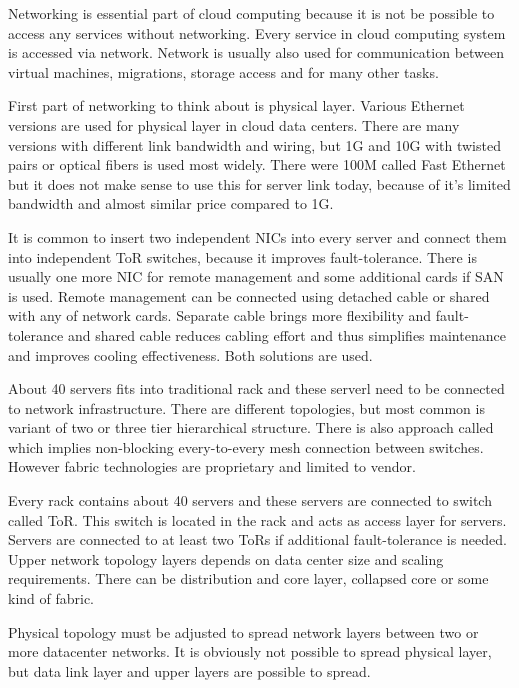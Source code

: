 

Networking is essential part of cloud computing because it is not be possible to access any services without networking. Every service in cloud computing system is accessed via network. Network is usually also used for communication between virtual machines, migrations, storage access and for many other tasks.


First part of networking to think about is physical layer. Various Ethernet versions are used for physical layer in cloud data centers. There are many versions with different link bandwidth and wiring, but 1G and 10G with twisted pairs or optical fibers is used most widely. There were 100M called Fast Ethernet but it does not make sense to use this for server link today, because of it's limited bandwidth and almost similar price compared to 1G.

It is common to insert two independent \Ac{NIC}s into every server and connect them into independent \Ac{ToR} switches, because it improves fault-tolerance. There is usually one more \Ac{NIC} for remote management and some additional cards if \Ac{SAN} is used. Remote management can be connected using detached cable or shared with any of network cards. Separate cable brings more flexibility and fault-tolerance and shared cable reduces cabling effort and thus simplifies maintenance and improves cooling effectiveness. Both solutions are used. 

About 40 servers fits into traditional rack and these serverl need to be connected to network infrastructure. There are different topologies, but most common is variant of two or three tier hierarchical structure. \cite{survey-architectures} There is also approach called  which implies non-blocking every-to-every mesh connection between switches. However fabric technologies are proprietary and limited to vendor. 

Every rack contains about 40 servers and these servers are connected to switch called \Ac{ToR}. This switch is located in the rack and acts as access layer for servers. Servers are connected to at least two \Ac{ToR}s if additional fault-tolerance is needed. Upper network topology layers depends on data center size and scaling requirements. There can be distribution and core layer, collapsed core or some kind of fabric.

Physical topology must be adjusted to spread network layers between two or more datacenter networks. It is obviously not possible to spread physical layer, but data link layer and upper layers are possible to spread.

